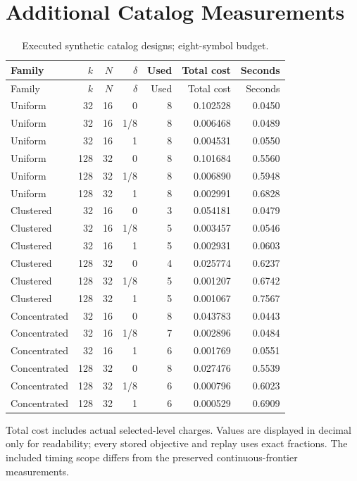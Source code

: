 \section{Additional Catalog Measurements}
\begin{longtable}{@{}lrrrrrr@{}}
\caption{Executed synthetic catalog designs; eight-symbol budget.}\\
\toprule Family & $k$ & $N$ & $\delta$ & Used & Total cost & Seconds\\\midrule\endfirsthead
\toprule Family & $k$ & $N$ & $\delta$ & Used & Total cost & Seconds\\\midrule\endhead
\bottomrule\endfoot
Uniform & 32 & 16 & 0 & 8 & 0.102528 & 0.0450 \\
Uniform & 32 & 16 & 1/8 & 8 & 0.006468 & 0.0489 \\
Uniform & 32 & 16 & 1 & 8 & 0.004531 & 0.0550 \\
Uniform & 128 & 32 & 0 & 8 & 0.101684 & 0.5560 \\
Uniform & 128 & 32 & 1/8 & 8 & 0.006890 & 0.5948 \\
Uniform & 128 & 32 & 1 & 8 & 0.002991 & 0.6828 \\
Clustered & 32 & 16 & 0 & 3 & 0.054181 & 0.0479 \\
Clustered & 32 & 16 & 1/8 & 5 & 0.003457 & 0.0546 \\
Clustered & 32 & 16 & 1 & 5 & 0.002931 & 0.0603 \\
Clustered & 128 & 32 & 0 & 4 & 0.025774 & 0.6237 \\
Clustered & 128 & 32 & 1/8 & 5 & 0.001207 & 0.6742 \\
Clustered & 128 & 32 & 1 & 5 & 0.001067 & 0.7567 \\
Concentrated & 32 & 16 & 0 & 8 & 0.043783 & 0.0443 \\
Concentrated & 32 & 16 & 1/8 & 7 & 0.002896 & 0.0484 \\
Concentrated & 32 & 16 & 1 & 6 & 0.001769 & 0.0551 \\
Concentrated & 128 & 32 & 0 & 8 & 0.027476 & 0.5539 \\
Concentrated & 128 & 32 & 1/8 & 6 & 0.000796 & 0.6023 \\
Concentrated & 128 & 32 & 1 & 6 & 0.000529 & 0.6909 \\
\end{longtable}
Total cost includes actual selected-level charges. Values are displayed in decimal only for readability; every stored objective and replay uses exact fractions. The included timing scope differs from the preserved continuous-frontier measurements.
